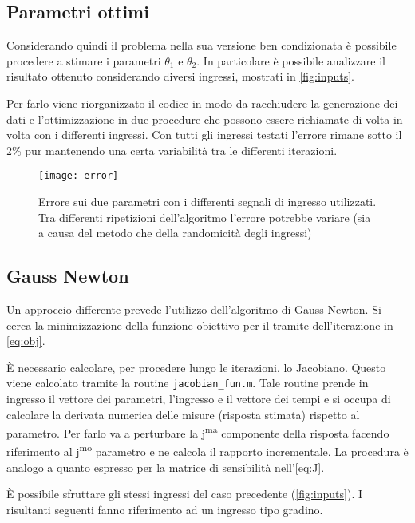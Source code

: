 \subsection{Parametri ottimi}

Considerando quindi il problema nella sua versione ben condizionata è possibile procedere a stimare i parametri $\theta_1$ e $\theta_2$. 
In particolare è possibile analizzare il risultato ottenuto considerando diversi ingressi, mostrati in \cref{fig:inputs}.

Per farlo viene riorganizzato il codice in modo da racchiudere la generazione dei dati e l'ottimizzazione in due procedure che possono essere richiamate di volta in volta con i differenti ingressi. Con tutti gli ingressi testati l'errore rimane sotto il 2\% pur mantenendo una certa variabilità tra le differenti iterazioni. 

\begin{figure}[bt]
	\centering
	\texttt{[image: error]}
	\caption{Errore sui due parametri con i differenti segnali di ingresso utilizzati. Tra differenti ripetizioni dell'algoritmo l'errore potrebbe variare (sia a causa del metodo che della randomicità degli ingressi)}
\end{figure}

\subsection{Gauss Newton}

Un approccio differente prevede l'utilizzo dell'algoritmo di Gauss Newton. Si cerca la minimizzazione della funzione obiettivo per il tramite dell'iterazione in \cref{eq:obj}. 

È necessario calcolare, per procedere lungo le iterazioni, lo Jacobiano. Questo viene calcolato tramite la routine \texttt{jacobian\_fun.m}. Tale routine prende in ingresso il vettore dei parametri, l'ingresso e il vettore dei tempi e si occupa di calcolare la derivata numerica delle misure (risposta stimata) rispetto al parametro. Per farlo va a perturbare la j\textsuperscript{ma} componente della risposta facendo riferimento al j\textsuperscript{mo} parametro e ne calcola il rapporto incrementale. La procedura è analogo a quanto espresso per la matrice di sensibilità nell'\cref{eq:J}. 

È possibile sfruttare gli stessi ingressi del caso precedente (\cref{fig:inputs}). I risultanti seguenti fanno riferimento ad un ingresso tipo gradino. 

